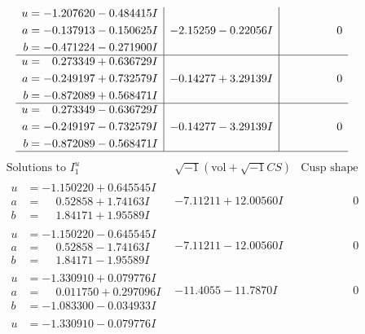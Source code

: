 \documentclass[1p]{elsarticle_modified}
\theoremstyle{definition}
\newcommand{\I}{\sqrt{-1}}
\begin{document}
$$\begin{array}{c|c|c}
\begin{aligned}
u &= -1.207620 - 0.484415 I \\
a &= -0.137913 - 0.150625 I \\
b &= -0.471224 - 0.271900 I\end{aligned}
 & -2.15259 - 0.22056 I & \phantom{-0.000000 } 0 \\ \hline\begin{aligned}
u &= \phantom{-}0.273349 + 0.636729 I \\
a &= -0.249197 + 0.732579 I \\
b &= -0.872089 + 0.568471 I\end{aligned}
 & -0.14277 + 3.29139 I & \phantom{-0.000000 } 0 \\ \hline\begin{aligned}
u &= \phantom{-}0.273349 - 0.636729 I \\
a &= -0.249197 - 0.732579 I \\
b &= -0.872089 - 0.568471 I\end{aligned}
 & -0.14277 - 3.29139 I & \phantom{-0.000000 } 0\\
 \hline 
 \end{array}$$\newpage$$\begin{array}{c|c|c}  
\text{Solutions to }I^u_{1}& \I (\text{vol} + \sqrt{-1}CS) & \text{Cusp shape}\\
 \hline 
\begin{aligned}
u &= -1.150220 + 0.645545 I \\
a &= \phantom{-}0.52858 + 1.74163 I \\
b &= \phantom{-}1.84171 + 1.95589 I\end{aligned}
 & -7.11211 + 12.00560 I & \phantom{-0.000000 } 0 \\ \hline\begin{aligned}
u &= -1.150220 - 0.645545 I \\
a &= \phantom{-}0.52858 - 1.74163 I \\
b &= \phantom{-}1.84171 - 1.95589 I\end{aligned}
 & -7.11211 - 12.00560 I & \phantom{-0.000000 } 0 \\ \hline\begin{aligned}
u &= -1.330910 + 0.079776 I \\
a &= \phantom{-}0.011750 + 0.297096 I \\
b &= -1.083300 - 0.034933 I\end{aligned}
 & -11.4055 - 11.7870 I & \phantom{-0.000000 } 0 \\ \hline\begin{aligned}
u &= -1.330910 - 0.079776 I \\

\end{aligned}
\end{array}$$
\end{document}
